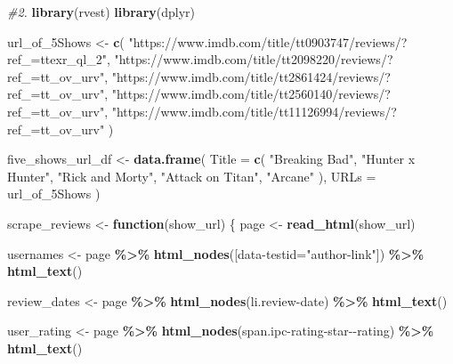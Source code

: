 \documentclass[
]{article}
\newenvironment{Shaded}{\begin{snugshade}}{\end{snugshade}}
\newcommand{\AttributeTok}[1]{\textcolor[rgb]{0.13,0.29,0.53}{#1}}
\newcommand{\CommentTok}[1]{\textcolor[rgb]{0.56,0.35,0.01}{\textit{#1}}}
\newcommand{\ControlFlowTok}[1]{\textcolor[rgb]{0.13,0.29,0.53}{\textbf{#1}}}
\newcommand{\FunctionTok}[1]{\textcolor[rgb]{0.13,0.29,0.53}{\textbf{#1}}}
\newcommand{\NormalTok}[1]{#1}
\newcommand{\OtherTok}[1]{\textcolor[rgb]{0.56,0.35,0.01}{#1}}
\newcommand{\SpecialCharTok}[1]{\textcolor[rgb]{0.81,0.36,0.00}{\textbf{#1}}}
\newcommand{\StringTok}[1]{\textcolor[rgb]{0.31,0.60,0.02}{#1}}
\begin{document}
\begin{Shaded}
\begin{Highlighting}[]
\CommentTok{\#2. }
\FunctionTok{library}\NormalTok{(rvest)}
\FunctionTok{library}\NormalTok{(dplyr)}

\NormalTok{url\_of\_5Shows }\OtherTok{\textless{}{-}} \FunctionTok{c}\NormalTok{(}
  \StringTok{"https://www.imdb.com/title/tt0903747/reviews/?ref\_=ttexr\_ql\_2"}\NormalTok{,}
  \StringTok{"https://www.imdb.com/title/tt2098220/reviews/?ref\_=tt\_ov\_urv"}\NormalTok{,}
  \StringTok{"https://www.imdb.com/title/tt2861424/reviews/?ref\_=tt\_ov\_urv"}\NormalTok{,}
  \StringTok{"https://www.imdb.com/title/tt2560140/reviews/?ref\_=tt\_ov\_urv"}\NormalTok{,}
  \StringTok{"https://www.imdb.com/title/tt11126994/reviews/?ref\_=tt\_ov\_urv"}
\NormalTok{)}

\NormalTok{five\_shows\_url\_df }\OtherTok{\textless{}{-}} \FunctionTok{data.frame}\NormalTok{(}
  \AttributeTok{Title =} \FunctionTok{c}\NormalTok{(}
    \StringTok{"Breaking Bad"}\NormalTok{,}
    \StringTok{"Hunter x Hunter"}\NormalTok{,}
    \StringTok{"Rick and Morty"}\NormalTok{,}
    \StringTok{"Attack on Titan"}\NormalTok{, }
    \StringTok{"Arcane"}
\NormalTok{  ),}
  \AttributeTok{URLs =}\NormalTok{ url\_of\_5Shows}
\NormalTok{) }


\NormalTok{scrape\_reviews }\OtherTok{\textless{}{-}} \ControlFlowTok{function}\NormalTok{(show\_url) \{}
\NormalTok{  page }\OtherTok{\textless{}{-}} \FunctionTok{read\_html}\NormalTok{(show\_url)}
  
 
\NormalTok{  usernames }\OtherTok{\textless{}{-}}\NormalTok{ page }\SpecialCharTok{\%\textgreater{}\%}
    \FunctionTok{html\_nodes}\NormalTok{(}\StringTok{\textquotesingle{}[data{-}testid="author{-}link"]\textquotesingle{}}\NormalTok{) }\SpecialCharTok{\%\textgreater{}\%}
    \FunctionTok{html\_text}\NormalTok{()}
  

\NormalTok{  review\_dates }\OtherTok{\textless{}{-}}\NormalTok{ page }\SpecialCharTok{\%\textgreater{}\%}
    \FunctionTok{html\_nodes}\NormalTok{(}\StringTok{\textquotesingle{}li.review{-}date\textquotesingle{}}\NormalTok{) }\SpecialCharTok{\%\textgreater{}\%}
    \FunctionTok{html\_text}\NormalTok{()}

\NormalTok{  user\_rating }\OtherTok{\textless{}{-}}\NormalTok{ page }\SpecialCharTok{\%\textgreater{}\%}
    \FunctionTok{html\_nodes}\NormalTok{(}\StringTok{\textquotesingle{}span.ipc{-}rating{-}star{-}{-}rating\textquotesingle{}}\NormalTok{) }\SpecialCharTok{\%\textgreater{}\%}
    \FunctionTok{html\_text}\NormalTok{()}
  

\end{Highlighting}
\end{Shaded}
\end{document}
